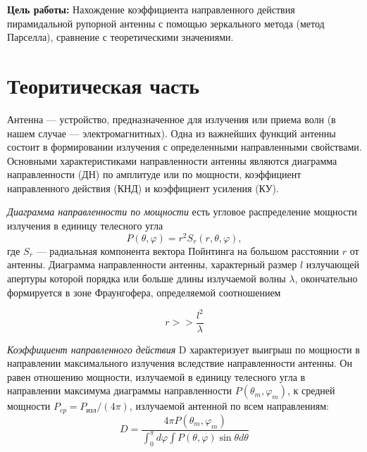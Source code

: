 



\def\labauthors{Виноградов И.Д., Шиков А.П.}
\def\labgroup{430}
\def\labnumber{7}
\def\labtheme{Определение коэффициента направленного действия рупорной антенны}


\newpage

{\bfseries Цель работы:} 
Нахождение коэффициента направленного действия пирамидальной рупорной антенны с помощью зеркального метода (метод
Парселла), сравнение с теоретическими значениями.

\section{Теоритическая часть}

Антенна — устройство, предназначенное для излучения или приема волн (в нашем случае — электромагнитных). Одна из
важнейших функций антенны состоит в формировании излучения с определенными направленными свойствами. Основными
характеристиками направленности антенны являются диаграмма направленности (ДН) по амплитуде или по мощности, коэффициент
 направленного действия (КНД) и коэффициент усиления (КУ). 

\textit{Диаграмма направленности по мощности} есть угловое распределение мощности излучения в единицу телесного угла 
$$P(\theta, \varphi)=r^{2} S_{r}(r, \theta, \varphi),$$
где $S_{r}$ — радиальная компонента вектора Пойнтинга на большом расстоянии $r$ от антенны. 
Диаграмма направленности антенны, характерный размер $l$ излучающей апертуры которой порядка или больше длины излучаемой
 волны $\lambda$, окончательно формируется в зоне Фраунгофера, определяемой соотношением 

\begin{equation}
    r>>\frac{l^2}{\lambda}
    \label{eq:1}
\end{equation}

\textit{Коэффициент направленного действия} D характеризует
выигрыш по  мощности в направлении максимального излучения вследствие направленности антенны. Он равен отношению 
мощности, излучаемой в единицу телесного угла в направлении максимума диаграммы направленности $P(\theta_m,\varphi_m)$, к средней 
мощности $P_{cp} = P_{\text{изл}} /(4\pi)$, излучаемой антенной по всем направлениям:
\begin{equation}
    D=\frac{4 \pi P\left(\theta_{m}, \varphi_{m}\right)}{\int_{0}^{\pi} d \varphi \int P(\theta, \varphi) \sin \theta d \theta}
    \label{eq:2}    
\end{equation}

